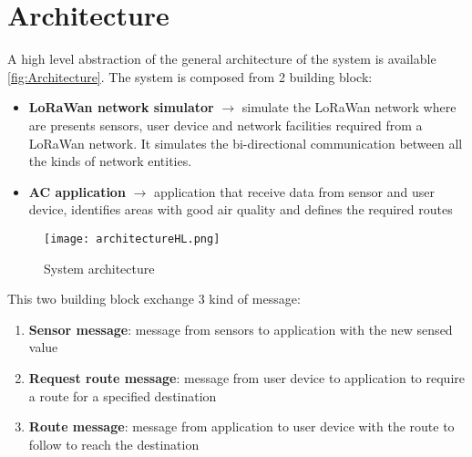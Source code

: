 \chapter{Architecture}

A high level abstraction of the general architecture of the system is available \autoref{fig:Architecture}.
The system is composed from 2 building block:
\begin{itemize}
    \item \textbf{LoRaWan network simulator} $\rightarrow$ simulate the LoRaWan network where are presents sensors, user device and network facilities required from a LoRaWan network. It simulates the bi-directional communication between all the kinds of network entities.
    \item \textbf{AC application} $\rightarrow$ application that receive data from sensor and user device, identifies areas with good air quality and defines the required routes
\end{itemize}

\begin{figure}[h]
    \centering
    \texttt{[image: architectureHL.png]}
    \caption{System architecture}
    \label{fig:Architecture}
\end{figure}

This two building block exchange 3 kind of message:
\begin{enumerate}
    \item \textbf{Sensor message}: message from sensors to application with the new sensed value
    \item \textbf{Request route message}: message from user device to application to require a route for a specified destination
    \item \textbf{Route message}: message from application to user device with the route to follow to reach the destination
\end{enumerate}

